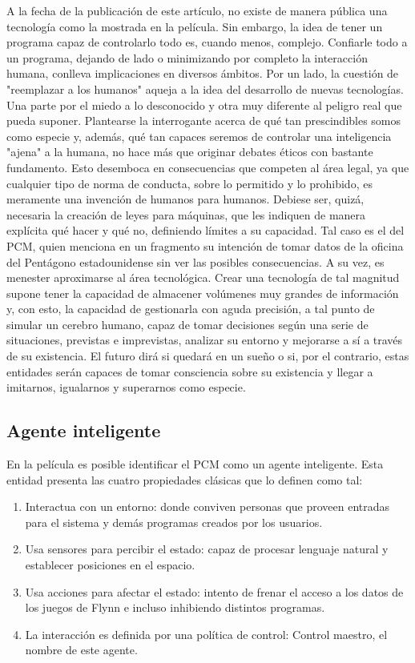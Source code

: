 \documentclass[]{scrreprt}
\begin{document}
A la fecha de la publicación de este artículo, no existe de manera pública una tecnología como la mostrada en la película. Sin embargo, la idea de tener un programa capaz de controlarlo todo es, cuando menos, complejo. Confiarle todo a un programa, dejando de lado o minimizando por completo la interacción humana, conlleva implicaciones en diversos ámbitos. Por un lado, la cuestión de "reemplazar a los humanos" aqueja a la idea del desarrollo de nuevas tecnologías. Una parte por el miedo a lo desconocido y otra muy diferente al peligro real que pueda suponer. Plantearse la interrogante acerca de qué tan prescindibles somos como especie y, además, qué tan capaces seremos de controlar una inteligencia "ajena" a la humana, no hace más que originar debates éticos con bastante fundamento. Esto desemboca en consecuencias que competen al área legal, ya que cualquier tipo de norma de conducta, sobre lo permitido y lo prohibido, es meramente una invención de humanos para humanos. Debiese ser, quizá, necesaria la creación de leyes para máquinas, que les indiquen de manera explícita qué hacer y qué no, definiendo límites a su capacidad. Tal caso es el del PCM, quien menciona en un fragmento su intención de tomar datos de la oficina del Pentágono estadounidense sin ver las posibles consecuencias. A su vez, es menester aproximarse al área tecnológica. Crear una tecnología de tal magnitud supone tener la capacidad de almacener volúmenes muy grandes de información y, con esto, la capacidad de gestionarla con aguda precisión, a tal punto de simular un cerebro humano, capaz de tomar decisiones según una serie de situaciones, previstas e imprevistas, analizar su entorno y mejorarse a sí a través de su existencia. El futuro dirá si quedará en un sueño o si, por el contrario, estas entidades serán capaces de tomar consciencia sobre su existencia y llegar a imitarnos, igualarnos y superarnos como especie.

\subsection{Agente inteligente}

En la película es posible identificar el PCM como un agente inteligente. Esta entidad presenta las cuatro propiedades clásicas que lo definen como tal:

\begin{enumerate}
    \item Interactua con un entorno: donde conviven personas que proveen entradas para el sistema y demás programas creados por los usuarios.
    \item Usa sensores para percibir el estado: capaz de procesar lenguaje natural y establecer posiciones en el espacio.
    \item Usa acciones para afectar el estado: intento de frenar el acceso a los datos de los juegos de Flynn e incluso inhibiendo distintos programas.
    \item La interacción es definida por una política de control: Control maestro, el nombre de este agente.
\end{enumerate}
\end{document}
